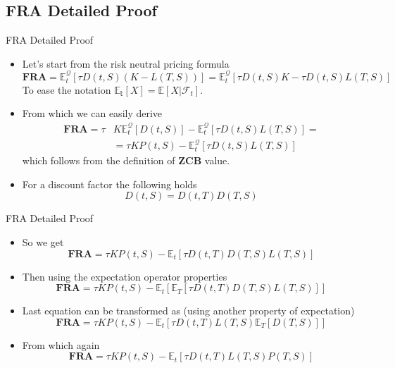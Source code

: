 \documentclass{beamer}
\begin{document}
\subsection{FRA Detailed Proof}
\begin{frame}{FRA Detailed Proof}
\begin{itemize}
	\item<1-> Let's start from the risk neutral pricing formula
	\begin{equation*} \textbf{FRA} = 
\mathbb{E}^\mathcal{Q}_t[\tau D(t,S)(K - L(T,S))] = 	\mathbb{E}^\mathcal{Q}_t[\tau D(t,S)K - \tau D(t,S)L(T,S)]
	\end{equation*}
	To ease the notation $\mathbb{E_t}[X] = \mathbb{E}[X|\mathcal{F}_t]$.
	\item<2-> From which we can easily derive
	\begin{equation*}
		\begin{aligned}
		\textbf{FRA} = \tau &K\mathbb{E}_t^\mathcal{Q}[D(t,S)] - \mathbb{E}_t^\mathcal{Q}[\tau D(t,S)L(T,S)] = \\
		&=\tau KP(t,S) - \mathbb{E}_t^\mathcal{Q}[\tau D(t,S)L(T,S)]
		\end{aligned}
	\end{equation*}
	which follows from the definition of \textbf{ZCB} value.
	\item<3-> For a discount factor the following holds
	\begin{equation*}
		D(t,S) = D(t,T)D(T,S)
	\end{equation*}
\end{itemize}
\end{frame}

\begin{frame}{FRA Detailed Proof}
	\begin{itemize}
		\item<1-> So we get
		\begin{equation*}
			\textbf{FRA} = \tau KP(t,S)-\mathbb{E}_t[\tau D(t,T)D(T,S)L(T,S)]
		\end{equation*}
		\item<2-> Then using the expectation operator properties
		\begin{equation*}
		\textbf{FRA} = \tau KP(t,S) - \mathbb{E}_t[\mathbb{E}_T[\tau D(t,T)D(T,S)L(T,S)]]
		\end{equation*}
		\item<3-> Last equation can be transformed as (using another property of expectation)
		\begin{equation*}
			\textbf{FRA} = \tau KP(t,S) - \mathbb{E}_t[\tau D(t,T)L(T,S)\mathbb{E}_T[D(T,S)]]
		\end{equation*}
		\item<4-> From which again
		\begin{equation*}
		\textbf{FRA} = \tau KP(t,S) - \mathbb{E}_t[\tau D(t,T)L(T,S)P(T,S)]
		\end{equation*}
	\end{itemize}
\end{frame}
\end{document}
